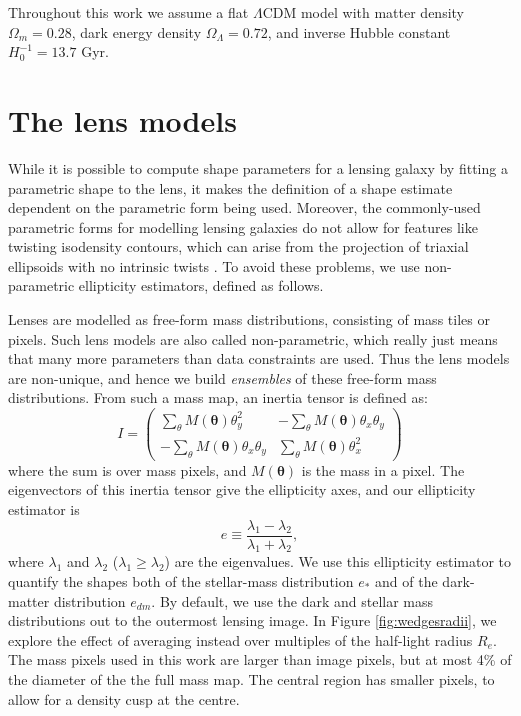 \documentclass[useAMS,usenatbib]{mn2e}
\begin{document}
Throughout this work we assume a flat $\Lambda$CDM model with matter density $\Omega_{m} = 0.28$, dark energy density $\Omega_{\Lambda} = 0.72$, and inverse Hubble constant $H_{0}^{-1} = 13.7$ Gyr.


\section{The lens models}\label{sec:shapemethod}

While it is possible to compute shape parameters for a lensing galaxy by fitting a parametric shape to the lens, it makes the definition of a shape estimate dependent on the parametric form being used. Moreover, the commonly-used parametric forms for modelling lensing galaxies \citep[e.g.][]{2001astro.ph..2341K} do not allow for features like twisting isodensity contours, which can arise from the projection of triaxial ellipsoids with no intrinsic twists \citep[e.g.][and references therein]{1978ComAp...8...27B}. To avoid these problems, we use non-parametric ellipticity estimators, defined as follows.

Lenses are modelled as free-form mass distributions, consisting of mass tiles or pixels. Such lens models are also called non-parametric, which really just means that many more parameters than data constraints are used. Thus the lens models are non-unique, and hence we build {\it ensembles} of these free-form mass distributions. From such a mass map, an inertia tensor is defined as:
\begin{equation}\label{eq:inertiatensor}
I = 
\begin{pmatrix}
 \sum_\theta M(\boldsymbol{\theta})\theta^{2}_{y} & -\sum_\theta M(\boldsymbol{\theta})\theta_{x}\theta_{y} \\
-\sum_\theta M(\boldsymbol{\theta})\theta_{x}\theta_{y} & \sum_\theta M(\boldsymbol{\theta})\theta^{2}_{x}
\end{pmatrix}
\end{equation}
where the sum is over mass pixels, and $M(\boldsymbol{\theta})$ is the mass in a pixel. The eigenvectors of this inertia tensor give the ellipticity axes, and our ellipticity estimator is
\begin{equation}\label{eq:shapeestimate}
    e \equiv \frac{\lambda_{1}-\lambda_{2}}{\lambda_{1}+\lambda_{2}},
\end{equation}
where $\lambda_{1}$ and $\lambda_{2}$ ($\lambda_{1} \geq \lambda_{2}$) are the eigenvalues. We use this ellipticity estimator to quantify the shapes both of the stellar-mass distribution $e_*$ and of the dark-matter distribution $e_{dm}$. By default, we use the dark and stellar mass distributions out to the outermost lensing image. In Figure \ref{fig:wedgesradii}, we explore the effect of averaging instead over multiples of the half-light radius $R_e$. The mass pixels used in this work are larger than image pixels, but at most 4\% of the diameter of the the full mass map. The central region has smaller pixels, to allow for a density cusp at the centre.
\end{document}
